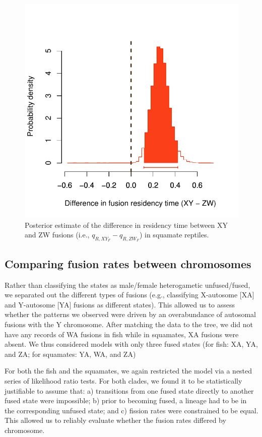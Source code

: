 \documentclass[12pt,twoside]{article}
\begin{document}
\begin{figure}[p]
\centering
\includegraphics[scale=1.1]{figs/karyotype-residency-squa-6par}
\caption{Posterior estimate of the difference in residency time between XY and ZW fusions (i.e., $q_{R,XY_F} - q_{R,ZW_F}$) in squamate reptiles.}
\label{fig:squa-resid}
\end{figure}


\subsection{Comparing fusion rates between chromosomes} 

Rather than classifying the states as male/female heterogametic unfused/fused, we separated out the different types of fusions (e.g., classifying X-autosome [XA] and Y-autosome [YA] fusions as different states). This allowed us to assess whether the patterns we observed were driven by an overabundance of autosomal fusions with the Y chromosome. After matching the data to the tree, we did not have any records of WA fusions in fish while in squamates, XA fusions were absent. We thus considered models with only three fused states (for fish: XA, YA, and ZA; for squamates: YA, WA, and ZA)

For both the fish and the squamates, we again restricted the model via a nested series of likelihood ratio tests. For both clades, we found it to be statistically justifiable to assume that: a) transitions from one fused state directly to another fused state were impossible; b) prior to becoming fused, a lineage had to be in the corresponding unfused state; and c) fission rates were constrained to be equal. This allowed us to reliably evaluate whether the fusion rates differed by chromosome.
\end{document}
